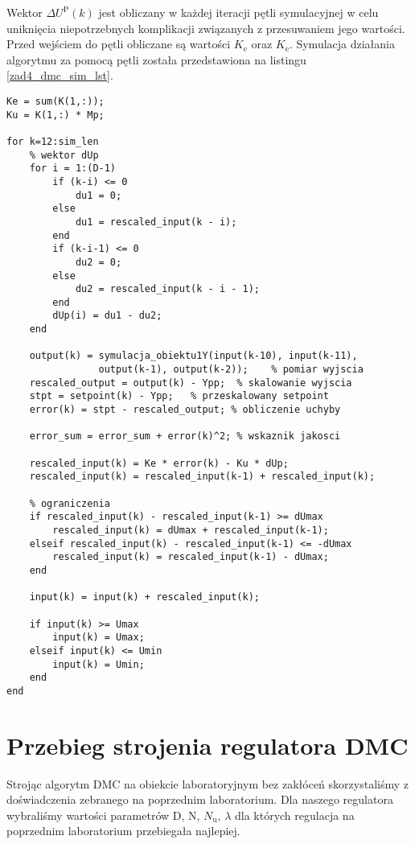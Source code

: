 Wektor $\Delta U^{\mathrm{P}}(k)$ jest obliczany w każdej iteracji pętli symulacyjnej w celu uniknięcia niepotrzebnych komplikacji związanych z przesuwaniem jego wartości. Przed wejściem do pętli obliczane są wartości $K_{\mathrm{e}}$ oraz $K_{\mathrm{e}}$. Symulacja działania algorytmu za pomocą pętli została przedstawiona na listingu \ref{zad4_dmc_sim_lst}.\\

\begin{lstlisting}[style=custommatlab,frame=single,label={zad4_dmc_sim_lst},caption={Pętla symulująca działanie regulatora DMC},captionpos=b]
Ke = sum(K(1,:));
Ku = K(1,:) * Mp;

for k=12:sim_len    
    % wektor dUp
    for i = 1:(D-1)
        if (k-i) <= 0
            du1 = 0;
        else
            du1 = rescaled_input(k - i);
        end
        if (k-i-1) <= 0
            du2 = 0;
        else
            du2 = rescaled_input(k - i - 1);
        end 
        dUp(i) = du1 - du2;
    end
    
    output(k) = symulacja_obiektu1Y(input(k-10), input(k-11),
    			output(k-1), output(k-2));    % pomiar wyjscia
    rescaled_output = output(k) - Ypp;  % skalowanie wyjscia   
    stpt = setpoint(k) - Ypp;   % przeskalowany setpoint
    error(k) = stpt - rescaled_output; % obliczenie uchyby   
    
    error_sum = error_sum + error(k)^2; % wskaznik jakosci
    
    rescaled_input(k) = Ke * error(k) - Ku * dUp;
    rescaled_input(k) = rescaled_input(k-1) + rescaled_input(k);
    
    % ograniczenia  
    if rescaled_input(k) - rescaled_input(k-1) >= dUmax
        rescaled_input(k) = dUmax + rescaled_input(k-1);
    elseif rescaled_input(k) - rescaled_input(k-1) <= -dUmax
        rescaled_input(k) = rescaled_input(k-1) - dUmax;
    end   
    
    input(k) = input(k) + rescaled_input(k);  
    
    if input(k) >= Umax
        input(k) = Umax;
    elseif input(k) <= Umin
        input(k) = Umin;
    end 
end
\end{lstlisting}


\section{Przebieg strojenia regulatora DMC}
Strojąc algorytm DMC na obiekcie laboratoryjnym bez zakłóceń skorzystaliśmy z doświadczenia zebranego na poprzednim laboratorium. Dla naszego regulatora wybraliśmy wartości parametrów D, N, $N_\mathrm{u}$, $\lambda$ dla których regulacja na poprzednim laboratorium przebiegała najlepiej.

